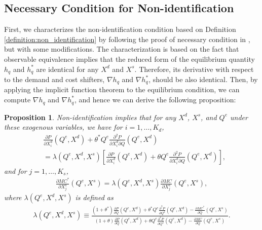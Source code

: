 \documentclass[11pt, a4paper]{article}
\newtheorem{proposition}{Proposition}
\theoremstyle{remark}
\begin{document}
\subsection{Necessary Condition for Non-identification}

First, we characterizes the non-identification condition based on Definition \ref{definition:non_identification} by following the proof of necessary condition in \citet{lau1982identifying}, but with some modifications.
The characterization is based on the fact that observable equivalence implies that the reduced form of the equilibrium quantity $h_q$ and $h_q^{*}$ are identical for any $X^{d}$ and $X^{s}$.
Therefore, its derivative with respect to the demand and cost shifters, $\nabla h_q$ and $\nabla h_q^{*}$, should be also identical.
Then, by applying the implicit function theorem to the equilibrium condition, we can compute $\nabla h_q$ and $\nabla h_q^{*}$, and hence we can derive the following proposition:
\begin{proposition}\label{proposition:nonidentification_charaterization}
    Non-identification implies that for any $X^{d}$, $X^{s}$, and $Q^e$ under these exogenous variables, we have for $i = 1, \ldots, K_d$,
    \begin{align}
        &\frac{\partial P}{\partial X^{d}_{i}}(Q^e, X^{d}) + \theta^{*} Q^e \frac{\partial^2 P}{\partial X^{d}_{i}\partial Q}(Q^e, X^{d})\\  
        &= \lambda(Q^e, X^{d}, X^{s})\left[ \frac{\partial P}{\partial X^{d}_{i}}(Q^e, X^{d}) + \theta Q^e \frac{\partial^2 P}{\partial X^{d}_{i}\partial Q}(Q^e, X^{d}) \right], \label{eq:nonidentification_demand}
    \end{align}
    and for $j = 1,\ldots, K_s$,
    \begin{align}
        \frac{\partial MC^{*}}{\partial X^{s}_j}(Q^e, X^{s}) = \lambda(Q^e, X^{d}, X^{s}) \frac{\partial MC}{\partial X^{s}_j}(Q^e, X^{s}),\label{eq:nonidentification_marginal_cost}
    \end{align}
    where $\lambda(Q^e, X^{d}, X^{s})$ is defined as
    \begin{align}
        \lambda(Q^e, X^{d}, X^{s}) \equiv \frac{(1+\theta^{*})\frac{\partial P}{\partial Q}(Q^e, X^{d}) + \theta^{*} Q^e\frac{\partial^2 P}{\partial Q^2}(Q^e, X^{d}) - \frac{\partial MC^{*}}{\partial Q}(Q^e, X^{s})}{(1+\theta)\frac{\partial P}{\partial Q}(Q^e, X^{d}) + \theta Q^e\frac{\partial^2 P}{\partial Q^2}(Q^e, X^{d}) - \frac{\partial MC}{\partial Q}(Q^e, X^{s})}. \label{eq:lambda_foc}
    \end{align}
\end{proposition}
\end{document}
